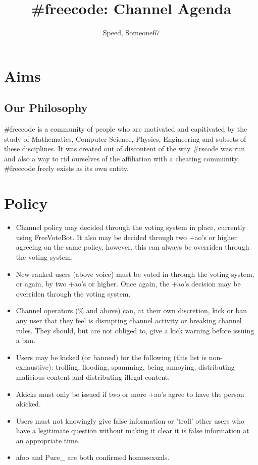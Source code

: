 \documentclass[11pt,a4paper,notitlepage]{article}
\title{\#freecode: Channel Agenda}
\author{Speed, Someone67}
\begin{document}
\maketitle

\section{Aims}
\subsection{Our Philosophy}
\#freecode is a community of people who are motivated and capitivated by the study of Mathematics, Computer Science, Physics, Engineering and subsets of these disciplines.
It was created out of  discontent of the way \#rscode was run and also a way to rid ourselves of the affiliation with a cheating community.
\#freecode freely exists as its own entity.

\section{Policy}
\begin{itemize}
\item Channel policy may decided through the voting system in place, currently using FreeVoteBot.
It also may be decided through two +ao's or higher agreeing on the same policy, however, this can always be overriden through the voting system.
\item New ranked users (above voice) must be voted in through the voting system, or again, by two +ao's or higher.
Once again, the +ao's decision may be overriden through the voting system.
\item Channel operators (\% and above) can, at their own discretion, kick or ban any user that they feel is disrupting channel activity or breaking channel rules.
They should, but are not obliged to, give a kick warning before issuing a ban.
\item Users may be kicked (or banned) for the following (this list is non-exhaustive): trolling, flooding, spamming, being annoying, distributing malicious content and distributing illegal content. 
\item Akicks must only be issued if two or more +ao's agree to have the person akicked. 
\item Users must not knowingly give false information or 'troll' other users who have a legitimate question without making it clear it is false information at an appropriate time.
\item afoo and Pure_ are both confirmed homosexuals.
\end{itemize}
\end{document}
